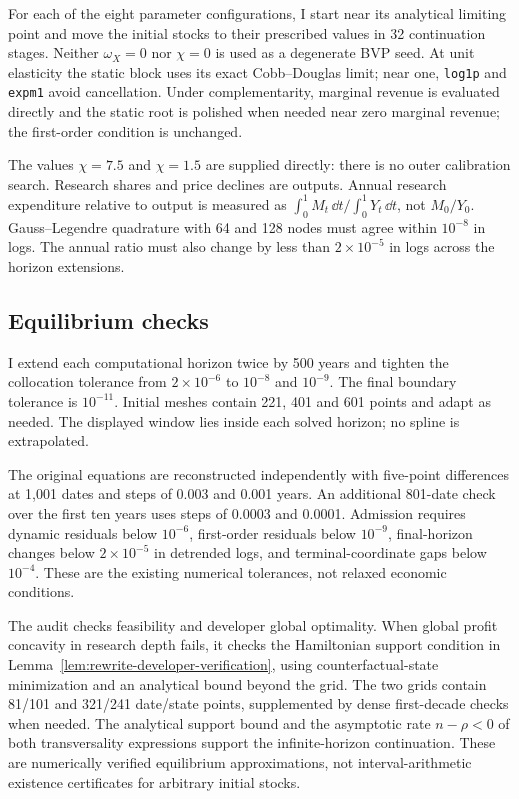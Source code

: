 For each of the eight parameter configurations, I start near its
analytical limiting point and move the initial stocks to their prescribed
values in 32 continuation stages. Neither $\omega_X=0$ nor $\chi=0$
is used as a degenerate BVP seed. At unit elasticity the static block
uses its exact Cobb--Douglas limit; near one, \texttt{log1p} and
\texttt{expm1} avoid cancellation. Under complementarity, marginal
revenue is evaluated directly and the static root is polished when
needed near zero marginal revenue; the first-order condition is unchanged.

The values $\chi=7.5$ and $\chi=1.5$ are supplied directly: there is no
outer calibration search. Research shares and price declines are outputs.
Annual research expenditure relative to output is measured as
$\int_0^1 M_t\,\dd t/\int_0^1Y_t\,\dd t$, not $M_0/Y_0$.
Gauss--Legendre quadrature with 64 and 128 nodes must agree within
$10^{-8}$ in logs. The annual ratio must also change by less than
$2\times10^{-5}$ in logs across the horizon extensions.

\subsection{Equilibrium checks}

I extend each computational horizon twice by 500 years and tighten the
collocation tolerance from $2\times10^{-6}$ to $10^{-8}$ and $10^{-9}$.
The final boundary tolerance is $10^{-11}$. Initial meshes contain
221, 401 and 601 points and adapt as needed. The displayed window lies
inside each solved horizon; no spline is extrapolated.

The original equations are reconstructed independently with five-point
differences at 1,001 dates and steps of 0.003 and 0.001 years. An additional
801-date check over the first ten years uses steps of 0.0003 and 0.0001.
Admission requires dynamic residuals below $10^{-6}$, first-order
residuals below $10^{-9}$, final-horizon changes below $2\times10^{-5}$
in detrended logs, and terminal-coordinate gaps below $10^{-4}$.
These are the existing numerical tolerances, not relaxed economic conditions.

The audit checks feasibility and developer global optimality. When
global profit concavity in research depth fails, it checks the Hamiltonian
support condition in Lemma~\ref{lem:rewrite-developer-verification},
using counterfactual-state minimization and an analytical bound beyond
the grid. The two grids contain 81/101 and 321/241 date/state points,
supplemented by dense first-decade checks when needed. The analytical
support bound and the asymptotic rate $n-\rho<0$ of both transversality
expressions support the infinite-horizon continuation. These are
numerically verified equilibrium approximations, not interval-arithmetic
existence certificates for arbitrary initial stocks.

